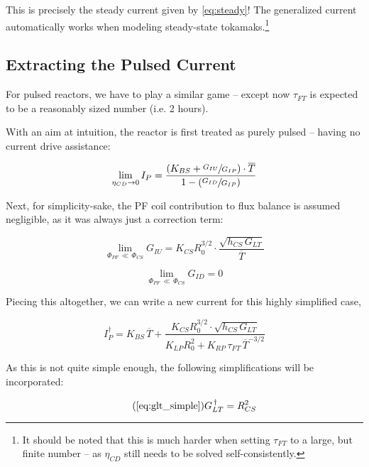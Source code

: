 This is precisely the steady current given by \cref{eq:steady}! The generalized current automatically works when modeling steady-state tokamaks.\footnote{ It should be noted that this is much harder when setting $\tau_{FT}$ to a large, but finite number -- as $\eta_{CD}$ still needs to be solved self-consistently. }

\subsection{Extracting the Pulsed Current}

For pulsed reactors, we have to play a similar game -- except now $\tau_{FT}$ is expected to be a reasonably sized number (i.e. 2 hours).

With an aim at intuition, the reactor is first treated as purely pulsed -- having no current drive assistance:

\begin{equation}
	\lim_{\eta_{CD} \to 0} I_P = \frac{ \left( K_{BS} + \sfrac{ G_{IU} }{ G_{IP} } \right) \cdot \overline T }{ 1 - \left( \sfrac{ G_{ID} }{ G_{IP} } \right) }
\end{equation}

Next, for simplicity-sake, the PF coil contribution to flux balance is assumed negligible, as it was always just a correction term:

\begin{equation}
	\lim_{ \Phi_{PF} \, \ll \, \Phi_{CS} } G_{IU} = K_{CS} R_0^{3/2} \cdot \frac{ \sqrt{ h_{CS} \, G_{LT} } }{ \overline T }
\end{equation}

\begin{equation}
	\lim_{ \Phi_{PF} \, \ll \, \Phi_{CS} } G_{ID} = 0
\end{equation}

Piecing this altogether, we can write a new current for this highly simplified case, 

\begin{equation}
	I_P^\dagger = K_{BS} \, \overline T + \frac{ K_{CS} R_0^{3/2} \cdot \sqrt{ h_{CS} \, G_{LT} } }{ K_{LP} R_0^2 + K_{RP} \, \tau_{FT} \, \overline T ^ {-3/2} }
\end{equation}

As this is not quite simple enough, the following simplifications will be incorporated:

\begin{equation}
	\tag{\ref{eq:glt_simple}}
	G_{LT}^{\,\dagger} = R_{CS}^2
\end{equation}

